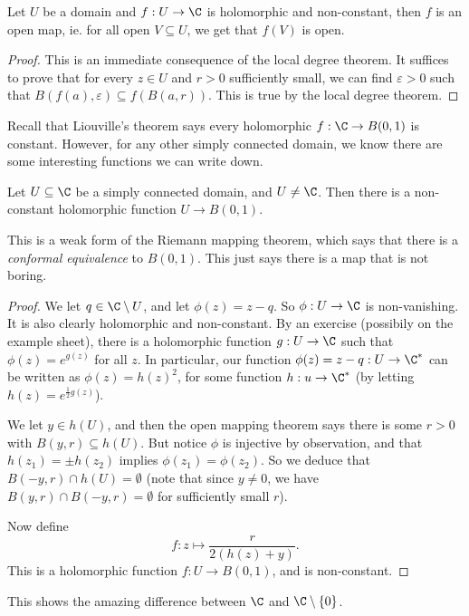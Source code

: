 \documentclass[a4paper]{article}
\begin{document}
\begin{cor}
  Let $U$ be a domain and $f: U \to \C$ is holomorphic and non-constant, then $f$ is an open map, ie. for all open $V \subseteq U$, we get that $f(V)$ is open.
\end{cor}

\begin{proof}
  This is an immediate consequence of the local degree theorem. It suffices to prove that for every $z \in U$ and $r > 0$ sufficiently small, we can find $\varepsilon > 0$ such that $B(f(a), \varepsilon) \subseteq f(B(a, r))$. This is true by the local degree theorem.
\end{proof}

Recall that Liouville's theorem says every holomorphic $f: \C \to B(0, 1)$ is constant. However, for any other simply connected domain, we know there are some interesting functions we can write down.

\begin{cor}
  Let $U\subseteq \C$ be a simply connected domain, and $U \not= \C$. Then there is a non-constant holomorphic function $U \to B(0, 1)$.
\end{cor}
This is a weak form of the Riemann mapping theorem, which says that there is a \emph{conformal equivalence} to $B(0, 1)$. This just says there is a map that is not boring.

\begin{proof}
  We let $q \in \C \setminus U$, and let $\phi(z) = z - q$. So $\phi: U \to \C$ is non-vanishing. It is also clearly holomorphic and non-constant. By an exercise (possibily on the example sheet), there is a holomorphic function $g: U \to \C$ such that $\phi(z) = e^{g(z)}$ for all $z$. In particular, our function $\phi(z) = z - q: U \to \C^*$ can be written as $\phi(z) = h(z)^2$, for some function $h: u \to \C^*$ (by letting $h(z) = e^{\frac{1}{2}g(z)}$).

  We let $y \in h(U)$, and then the open mapping theorem says there is some $r > 0$ with $B(y, r) \subseteq h(U)$. But notice $\phi$ is injective by observation, and that $h(z_1) = \pm h(z_2)$ implies $\phi(z_1) = \phi(z_2)$. So we deduce that $B(-y, r) \cap h(U) = \emptyset$ (note that since $y \not= 0$, we have $B(y, r) \cap B(-y, r) = \emptyset$ for sufficiently small $r$).

  Now define
  \[
    f: z \mapsto \frac{r}{2(h(z) + y)}.
  \]
  This is a holomorphic function $f: U \to B(0, 1)$, and is non-constant.
\end{proof}
This shows the amazing difference between $\C$ and $\C \setminus \{0\}$.
\end{document}

